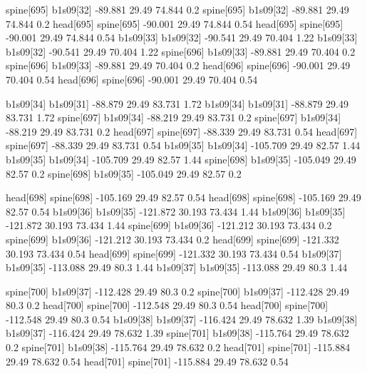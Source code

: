 spine[695]    b1s09[32]    -89.881    29.49    74.844    0.2
spine[695]    b1s09[32]    -89.881    29.49    74.844    0.2
head[695]    spine[695]    -90.001    29.49    74.844    0.54
head[695]    spine[695]    -90.001    29.49    74.844    0.54
b1s09[33]    b1s09[32]    -90.541    29.49    70.404    1.22
b1s09[33]    b1s09[32]    -90.541    29.49    70.404    1.22
spine[696]    b1s09[33]    -89.881    29.49    70.404    0.2
spine[696]    b1s09[33]    -89.881    29.49    70.404    0.2
head[696]    spine[696]    -90.001    29.49    70.404    0.54
head[696]    spine[696]    -90.001    29.49    70.404    0.54


b1s09[34]    b1s09[31]    -88.879    29.49    83.731    1.72
b1s09[34]    b1s09[31]    -88.879    29.49    83.731    1.72
spine[697]    b1s09[34]    -88.219    29.49    83.731    0.2
spine[697]    b1s09[34]    -88.219    29.49    83.731    0.2
head[697]    spine[697]    -88.339    29.49    83.731    0.54
head[697]    spine[697]    -88.339    29.49    83.731    0.54
b1s09[35]    b1s09[34]    -105.709    29.49    82.57    1.44
b1s09[35]    b1s09[34]    -105.709    29.49    82.57    1.44
spine[698]    b1s09[35]    -105.049    29.49    82.57    0.2
spine[698]    b1s09[35]    -105.049    29.49    82.57    0.2


head[698]    spine[698]    -105.169    29.49    82.57    0.54
head[698]    spine[698]    -105.169    29.49    82.57    0.54
b1s09[36]    b1s09[35]    -121.872    30.193    73.434    1.44
b1s09[36]    b1s09[35]    -121.872    30.193    73.434    1.44
spine[699]    b1s09[36]    -121.212    30.193    73.434    0.2
spine[699]    b1s09[36]    -121.212    30.193    73.434    0.2
head[699]    spine[699]    -121.332    30.193    73.434    0.54
head[699]    spine[699]    -121.332    30.193    73.434    0.54
b1s09[37]    b1s09[35]    -113.088    29.49    80.3    1.44
b1s09[37]    b1s09[35]    -113.088    29.49    80.3    1.44


spine[700]    b1s09[37]    -112.428    29.49    80.3    0.2
spine[700]    b1s09[37]    -112.428    29.49    80.3    0.2
head[700]    spine[700]    -112.548    29.49    80.3    0.54
head[700]    spine[700]    -112.548    29.49    80.3    0.54
b1s09[38]    b1s09[37]    -116.424    29.49    78.632    1.39
b1s09[38]    b1s09[37]    -116.424    29.49    78.632    1.39
spine[701]    b1s09[38]    -115.764    29.49    78.632    0.2
spine[701]    b1s09[38]    -115.764    29.49    78.632    0.2
head[701]    spine[701]    -115.884    29.49    78.632    0.54
head[701]    spine[701]    -115.884    29.49    78.632    0.54


